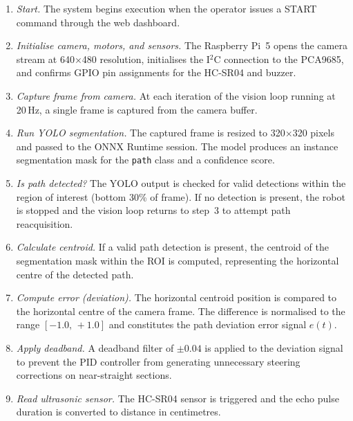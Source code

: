 \begin{enumerate}

  \item \emph{Start.} The system begins execution when the operator
        issues a START command through the web dashboard.

  \item \emph{Initialise camera, motors, and sensors.} The Raspberry
        Pi~5 opens the camera stream at 640$\times$480 resolution,
        initialises the I$^2$C connection to the PCA9685, and confirms
        GPIO pin assignments for the HC-SR04 and buzzer.

  \item \emph{Capture frame from camera.} At each iteration of the
        vision loop running at 20\,Hz, a single frame is captured from
        the camera buffer.

  \item \emph{Run YOLO segmentation.} The captured frame is resized
        to 320$\times$320 pixels and passed to the ONNX Runtime session.
        The model produces an instance segmentation mask for the
        \texttt{path} class and a confidence score.

  \item \emph{Is path detected?} The YOLO output is checked for valid
        detections within the region of interest (bottom 30\% of frame).
        If no detection is present, the robot is stopped and the vision
        loop returns to step~3 to attempt path reacquisition.

  \item \emph{Calculate centroid.} If a valid path detection is present,
        the centroid of the segmentation mask within the ROI is computed,
        representing the horizontal centre of the detected path.

  \item \emph{Compute error (deviation).} The horizontal centroid
        position is compared to the horizontal centre of the camera
        frame. The difference is normalised to the range
        $[-1.0,\,+1.0]$ and constitutes the path deviation error
        signal $e(t)$.

  \item \emph{Apply deadband.} A deadband filter of $\pm 0.04$ is
        applied to the deviation signal to prevent the PID controller
        from generating unnecessary steering corrections on
        near-straight sections.

  \item \emph{Read ultrasonic sensor.} The HC-SR04 sensor is triggered
        and the echo pulse duration is converted to distance in
        centimetres.


\end{enumerate}
